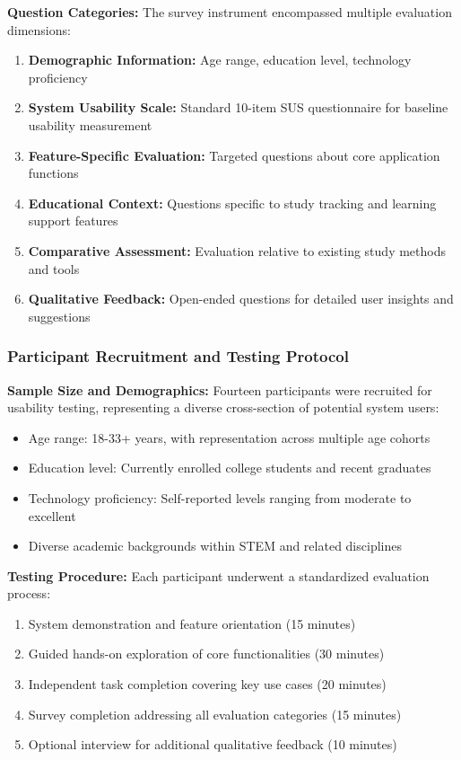 \textbf{Question Categories:} The survey instrument encompassed multiple evaluation dimensions:
\begin{enumerate}
    \item \textbf{Demographic Information:} Age range, education level, technology proficiency
    \item \textbf{System Usability Scale:} Standard 10-item SUS questionnaire for baseline usability measurement
    \item \textbf{Feature-Specific Evaluation:} Targeted questions about core application functions
    \item \textbf{Educational Context:} Questions specific to study tracking and learning support features
    \item \textbf{Comparative Assessment:} Evaluation relative to existing study methods and tools
    \item \textbf{Qualitative Feedback:} Open-ended questions for detailed user insights and suggestions
\end{enumerate}

\subsubsection{Participant Recruitment and Testing Protocol}

\textbf{Sample Size and Demographics:} Fourteen participants were recruited for usability testing, representing a diverse cross-section of potential system users:
\begin{itemize}
    \item Age range: 18-33+ years, with representation across multiple age cohorts
    \item Education level: Currently enrolled college students and recent graduates
    \item Technology proficiency: Self-reported levels ranging from moderate to excellent
    \item Diverse academic backgrounds within STEM and related disciplines
\end{itemize}

\textbf{Testing Procedure:} Each participant underwent a standardized evaluation process:
\begin{enumerate}
    \item System demonstration and feature orientation (15 minutes)
    \item Guided hands-on exploration of core functionalities (30 minutes)
    \item Independent task completion covering key use cases (20 minutes)
    \item Survey completion addressing all evaluation categories (15 minutes)
    \item Optional interview for additional qualitative feedback (10 minutes)
\end{enumerate}

